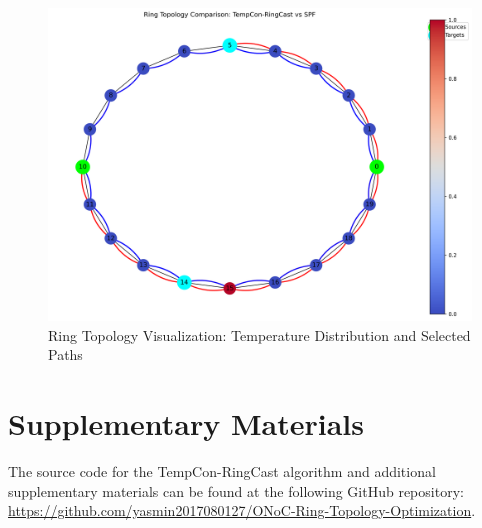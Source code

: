\documentclass[conference]{IEEEtran}
\begin{document}
\begin{figure}[h]
    \centering
    \includegraphics[width=\linewidth]{results/plots/ring_topology_comparison.png}
    \caption{Ring Topology Visualization: Temperature Distribution and Selected Paths}
    \label{fig:topology_comparison}
\end{figure}

\appendices
\section{Supplementary Materials}
The source code for the TempCon-RingCast algorithm and additional supplementary materials can be found at the following GitHub repository: \href{https://github.com/yasmin2017080127/ONoC-Ring-Topology-Optimization}{https://github.com/yasmin2017080127/ONoC-Ring-Topology-Optimization}.




\end{document}
